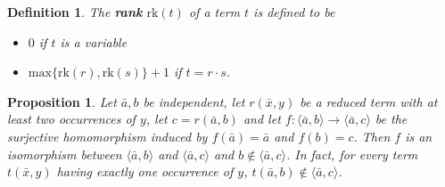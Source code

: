 \documentclass[10pt,a4paper]{article}
\newcommand{\rk}{\mathrm{rk}}
\theoremstyle{note}
\newtheorem{df}[thm]{Definition}
\newtheorem{prop}[thm]{Proposition}
\begin{document}
	
	\begin{df} The \textbf{rank} $\rk(t)$ of a term $t$ is defined to be
		\begin{itemize}
			\item $0$ if $t$ is a variable
			\item $\mathrm{max} \{ \rk (r), \rk(s) \} + 1$ if $t = r\cdot s$.
		\end{itemize}
	\end{df}

\begin{prop}\label{finalprop} Let $\bar{a},b$ be independent, let $r(\bar{x},y)$ be a reduced term with at least two occurrences of $y$, let $c=r(\bar{a},b)$  and let $f:\langle \bar{a},b\rangle\rightarrow \langle\bar{a},c\rangle$ be the surjective homomorphism induced by $f(\bar{a})=\bar{a}$  and $f(b)=c$. Then  $f$ is an isomorphism between $\langle \bar{a},b\rangle$ and $\langle\bar{a},c\rangle$  and  $b\not \in\langle\bar{a},c\rangle$. In fact, for every term $t(\bar{x},y)$ having exactly one occurrence of $y$,  $t(\bar{a},b)\not \in\langle \bar{a},c\rangle$.
\end{prop}
\end{document}
